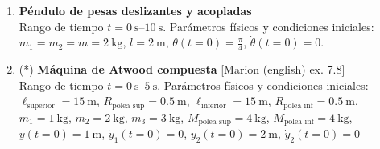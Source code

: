 \documentclass[11pt, spanish, a4paper, twoside]{article}
\begin{document}
\begin{enumerate}
\item 
	\begin{minipage}[t][3cm]{0.7\textwidth}
	\textbf{Péndulo de pesas deslizantes y acopladas}\\ 
	Rango de tiempo \(t = \SIrange{0}{10}{\second}\).
	Parámetros físicos y condiciones iniciales:\\
	\(m_1 = m_2 = m = \SI{2}{\kilo\gram}\), \(l = \SI{2}{\metre}\), \(\theta(t=0) = \frac{\pi}{4}\), \(\dot{\theta}(t=0) = 0\).
	\end{minipage}
	\begin{minipage}[c][2cm][t]{0.3\textwidth}
		
	\end{minipage}



%




\newpage
\item
\begin{minipage}[t][2cm]{0.65\textwidth}
(*) \textbf{Máquina de Atwood compuesta} [Marion (english) ex. 7.8]\\ 
Rango de tiempo \(t = \SIrange{0}{5}{\second}\).
Parámetros físicos y condiciones iniciales:\\
\(\ell_\text{superior} = \SI{15}{\metre}\), 
\(R_{\text{polea sup}} = \SI{0.5}{\metre}\), 
\(\ell_\text{inferior} = \SI{15}{\metre}\), 
\(R_{\text{polea inf}} = \SI{0.5}{\metre}\),\\ 
\(m_1 = \SI{1}{\kilo\gram}\),
\(m_2 = \SI{2}{\kilo\gram}\),
\(m_3 = \SI{3}{\kilo\gram}\),
\(M_{\text{polea sup}} = \SI{4}{\kilo\gram}\),
\(M_{\text{polea inf}} = \SI{4}{\kilo\gram}\),\\
\(y(t=0) = \SI{1}{\metre}\), \(\dot{y}_1(t=0) = 0\),
\(y_2(t=0) = \SI{2}{\metre}\), \(\dot{y}_2(t=0) = 0\)
\end{minipage}
\begin{minipage}[c][3cm][t]{0.3\textwidth}
	
\end{minipage}




\end{enumerate}
\end{document}
